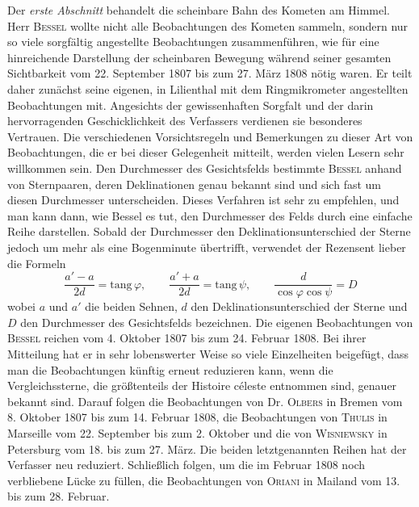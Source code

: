 Der \emph{erste Abschnitt} behandelt die scheinbare Bahn des Kometen am Himmel. Herr \textsc{Bessel} wollte nicht alle Beobachtungen des Kometen sammeln, sondern nur so viele sorgfältig angestellte Beobachtungen zusammenführen, wie für eine hinreichende Darstellung der scheinbaren Bewegung während seiner gesamten Sichtbarkeit vom 22. September 1807 bis zum 27. März 1808 nötig waren. Er teilt daher zunächst seine eigenen, in Lilienthal mit dem Ringmikrometer angestellten Beobachtungen mit. Angesichts der gewissenhaften Sorgfalt und der darin hervorragenden Geschicklichkeit des Verfassers verdienen sie besonderes Vertrauen. Die verschiedenen Vorsichtsregeln und Bemerkungen zu dieser Art von Beobachtungen, die er bei dieser Gelegenheit mitteilt, werden vielen Lesern sehr willkommen sein. Den Durchmesser des Gesichtsfelds bestimmte \textsc{Bessel} anhand von Sternpaaren, deren Deklinationen genau bekannt sind und sich fast um diesen Durchmesser unterscheiden. Dieses Verfahren ist sehr zu empfehlen, und man kann dann, wie Bessel es tut, den Durchmesser des Felds durch eine einfache Reihe darstellen. Sobald der Durchmesser den Deklinationsunterschied der Sterne jedoch um mehr als eine Bogenminute übertrifft, verwendet der Rezensent lieber die Formeln \[
\frac{a'-a}{2d}=\mathrm{tang}\,\varphi,\qquad \frac{a'+a}{2d}=\mathrm{tang}\,\psi,\qquad \frac{d}{\cos\varphi\cos\psi}=D
\] wobei $a$ und $a'$ die beiden Sehnen, $d$ den Deklinationsunterschied der Sterne und $D$ den Durchmesser des Gesichtsfelds bezeichnen. Die eigenen Beobachtungen von \textsc{Bessel} reichen vom 4. Oktober 1807 bis zum 24. Februar 1808. Bei ihrer Mitteilung hat er in sehr lobenswerter Weise so viele Einzelheiten beigefügt, dass man die Beobachtungen künftig erneut reduzieren kann, wenn die Vergleichssterne, die größtenteils der Histoire céleste entnommen sind, genauer bekannt sind. Darauf folgen die Beobachtungen von Dr. \textsc{Olbers} in Bremen vom 8. Oktober 1807 bis zum 14. Februar 1808, die Beobachtungen von \textsc{Thulis} in Marseille vom 22. September bis zum 2. Oktober und die von \textsc{Wisniewsky} in Petersburg vom 18. bis zum 27. März. Die beiden letztgenannten Reihen hat der Verfasser neu reduziert. Schließlich folgen, um die im Februar 1808 noch verbliebene Lücke zu füllen, die Beobachtungen von \textsc{Oriani} in Mailand vom 13. bis zum 28. Februar.

